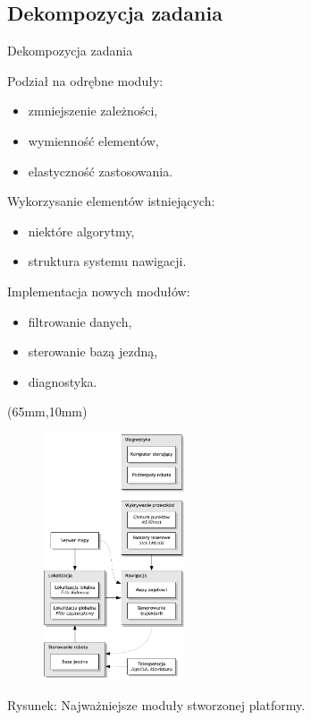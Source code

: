 \documentclass[xcolor=x11names,compress]{beamer}
\renewcommand{\(}{\begin{columns}}
\renewcommand{\)}{\end{columns}}
\newcommand{\<}[1]{\begin{column}{#1}}
\renewcommand{\>}{\end{column}}
\begin{document}
\subsection{Dekompozycja zadania}
\begin{frame}{Dekompozycja zadania}

\alert{Podział na odrębne moduły:}
\begin{itemize}
\item zmniejszenie zależności,
\item wymienność elementów,
\item elastyczność zastosowania.
\end{itemize}

\vspace{.2cm}

\alert{Wykorzysanie elementów istniejących:}
\begin{itemize}
\item niektóre algorytmy,
\item struktura systemu nawigacji.
\end{itemize}

\vspace{.2cm}

\alert{Implementacja nowych modułów:}
\begin{itemize}
\item filtrowanie danych,
\item sterowanie bazą jezdną,
\item diagnostyka.
\end{itemize}

\begin{textblock*}{70mm}(65mm,10mm)%
    \begin{minipage}[l]{70mm}%

	\begin{figure}[h!]
    \centering
    \includegraphics[width=4.2cm]{../MSc/img/decomposition_vert}
    \end{figure}
    \end{minipage}
\end{textblock*}

\hspace{3.5cm} \scriptsize \alert{Rysunek:} Najważniejsze moduły stworzonej platformy.

\end{frame}
\end{document}
